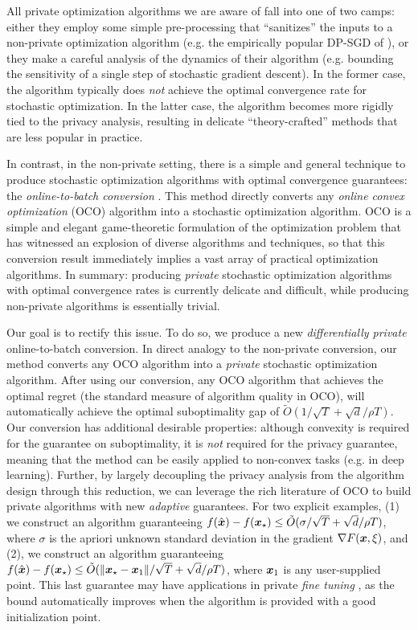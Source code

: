 All private optimization algorithms we are aware of fall into one of two camps: either they employ some simple pre-processing that ``sanitizes'' the inputs to a non-private optimization algorithm (e.g. the empirically popular DP-SGD of \cite{abadi2016deep}), or they make a careful analysis of the dynamics of their algorithm (e.g. bounding the sensitivity of a single step of stochastic gradient descent). In the former case, the algorithm typically does \emph{not} achieve the optimal convergence rate for stochastic optimization. In the latter case, the algorithm becomes more rigidly tied to the privacy analysis, resulting in delicate ``theory-crafted'' methods that are less popular in practice.

In contrast, in the non-private setting, there is a simple and general technique to produce stochastic optimization algorithms with optimal convergence guarantees: the \emph{online-to-batch conversion} \citep{cesa2004generalization}. This method directly converts any \emph{online convex optimization} (OCO)\citep{shalev2011online, hazan2019introduction, orabona2019modern} algorithm into a stochastic optimization algorithm. OCO is a simple and elegant game-theoretic formulation of the optimization problem that has witnessed an explosion of diverse algorithms and techniques, so that this conversion result immediately implies a vast array of practical optimization algorithms.
In summary: producing \emph{private} stochastic optimization algorithms with optimal convergence rates is currently delicate and difficult, while producing non-private algorithms is essentially trivial.

Our goal is to rectify this issue. To do so, we produce a new \emph{differentially private} online-to-batch conversion. In direct analogy to the non-private conversion, our method converts any OCO algorithm into a \emph{private} stochastic optimization algorithm. After using our conversion, any OCO algorithm that achieves the optimal regret (the standard measure of algorithm quality in OCO), will automatically achieve the optimal suboptimality gap of $\tilde O(1/\sqrt{T} + \sqrt{d}/\rho T)$. Our conversion has additional desirable properties: although convexity is required for the guarantee on suboptimality, it is \emph{not} required for the privacy guarantee, meaning that the method can be easily applied to non-convex tasks (e.g. in deep learning). Further, by largely decoupling the privacy analysis from the algorithm design through this reduction, we can leverage the rich literature of OCO to build private algorithms with new \emph{adaptive} guarantees. For two explicit examples, (1) we construct an algorithm guaranteeing $f(\hat {{\boldsymbol{x}}})-f({\boldsymbol{x}}_\star)\le \tilde O(\sigma /\sqrt{T}+ \sqrt{d}/\rho T)$, where $\sigma$ is the apriori unknown standard deviation in the gradient $\nabla F({\boldsymbol{x}},\xi)$, and (2), we construct an algorithm guaranteeing $f(\hat {{\boldsymbol{x}}})-f({\boldsymbol{x}}_\star)\le \tilde O(\|{\boldsymbol{x}}_\star-{\boldsymbol{x}}_1\|/\sqrt{T} + \sqrt{d}/\rho T) $, where ${\boldsymbol{x}}_1$ is any user-supplied point. This last guarantee may have applications in private \emph{fine tuning} \citep{li2022private, yu2021differentially, hoory2021learning, kurakin2022toward, mehta2022large}, as the bound automatically improves when the algorithm is provided with a good initialization point.



